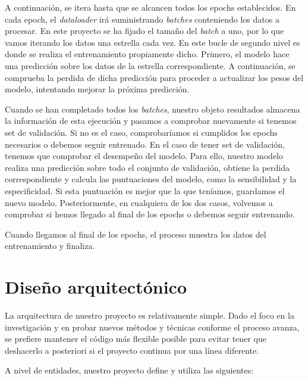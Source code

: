 A continuación, se itera hasta que se alcancen todos los epochs establecidos. En cada epoch, el \textit{dataloader} irá suministrando \textit{batches} conteniendo los datos a procesar. En este proyecto se ha fijado el tamaño del \textit{batch} a uno, por lo que vamos iterando los datos una estrella cada vez. En este bucle de segundo nivel es donde se realiza el entrenamiento propiamente dicho. Primero, el modelo hace una predicción sobre los datos de la estrella correspondiente. A continuación, se comprueba la perdida de dicha predicción para proceder a actualizar los pesos del modelo, intentando mejorar la próxima predicción.

Cuando se han completado todos los \textit{batches}, nuestro objeto resultados almacena la información de esta ejecución y pasamos a comprobar nuevamente si tenemos set de validación. Si no es el caso, comprobaríamos si cumplidos los epochs necesarios o debemos seguir entrenado. En el caso de tener set de validación, tenemos que comprobar el desempeño del modelo. Para ello, nuestro modelo realiza una predicción sobre todo el conjunto de validación, obtiene la perdida correspondiente y calcula las puntuaciones del modelo, como la sensibilidad y la especificidad. Si esta puntuación es mejor que la que teníamos, guardamos el nuevo modelo. Posteriormente, en cualquiera de los dos casos, volvemos a comprobar si hemos llegado al final de los epochs o debemos seguir entrenando.

Cuando llegamos al final de los epochs, el proceso muestra los datos del entrenamiento y finaliza.


\section{Diseño arquitectónico}

La arquitectura de nuestro proyecto es relativamente simple. Dado el foco en la investigación y en probar nuevos métodos y técnicas conforme el proceso avanza, se prefiere mantener el código más flexible posible para evitar tener que deshacerlo a posteriori si el proyecto continua por una línea diferente.

A nivel de entidades, nuestro proyecto define y utiliza las siguientes:

